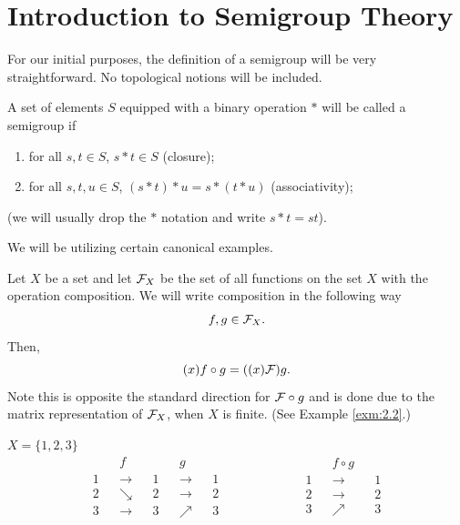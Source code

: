 


\section{Introduction to Semigroup Theory}
\label{sec:2.1}


For our initial purposes, the definition of a semigroup will be
very straightforward.  No topological notions will be included.

\begin{definition}   \label{defn:2.1}
 A set of elements $S$ equipped with a binary operation
     $*$ will be called a semigroup if
\begin{enumerate}
\item[(a)] for all $s,t \in S$, $s * t \in S$ (closure);

\item[(b)] for all $s,t,u \in S$, $(s * t) * u = s * (t*u)$
     (associativity);
\end{enumerate}
\end{definition}

\noindent
(we will usually drop the $*$ notation and write $s*t = st$).

We will be utilizing certain canonical examples.

\begin{example}	\label{exm:2.1}
Let $X$ be a set and let $\mathcal{F}_X$ be the set of all functions on the set $X$ with the operation composition.  
We will write composition in the following way
\[
  f,g \in \mathcal{F}_X.
\]
Then,
\[
  (x)f \circ g = ((x)\mathcal{F})g.
\]
Note this is opposite the standard direction for $\mathcal{F} \circ g$ and is done due to the matrix representation of $\mathcal{F}_X$, when $X$ is finite.
(See Example \ref{exm:2.2}.)
\end{example}

  $X = \{1,2,3\}$
\[
  \begin{matrix}
         &&f           &&   &&g           &&  \\
      1  &&\rightarrow &&1  &&\rightarrow &&1 \\
      2  &&\searrow    &&2  &&\rightarrow &&2 \\
      3  &&\rightarrow &&3  &&\nearrow    &&3 \\
     \end{matrix} \qquad \qquad \qquad
     \begin{matrix}
         &&f \circ g   &&  \\
      1  &&\rightarrow &&1 \\
      2  &&\rightarrow &&2 \\
      3  &&\nearrow    &&3 \\
     \end{matrix}
\]

